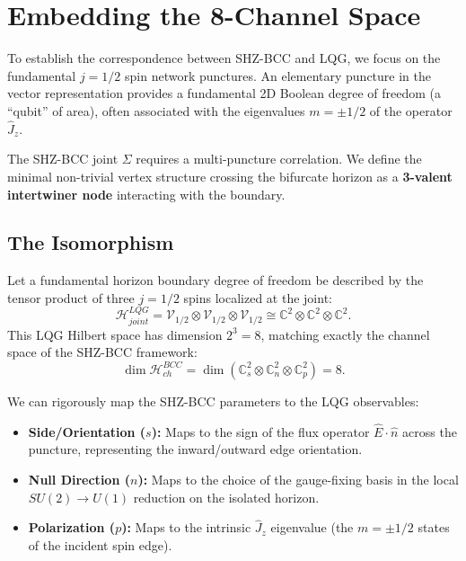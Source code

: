 \documentclass[11pt,a4paper]{article}
\begin{document}
\section{Embedding the 8-Channel Space}
To establish the correspondence between SHZ-BCC and LQG, we focus on the fundamental $j = 1/2$ spin network punctures. An elementary puncture in the vector representation provides a fundamental 2D Boolean degree of freedom (a ``qubit'' of area), often associated with the eigenvalues $m = \pm 1/2$ of the operator $\hat{J}_z$.

The SHZ-BCC joint $\Sigma$ requires a multi-puncture correlation. We define the minimal non-trivial vertex structure crossing the bifurcate horizon as a \textbf{3-valent intertwiner node} interacting with the boundary. 

\subsection{The Isomorphism}
Let a fundamental horizon boundary degree of freedom be described by the tensor product of three $j=1/2$ spins localized at the joint:
\begin{equation}
    \mathcal{H}_{joint}^{LQG} = \mathcal{V}_{1/2} \otimes \mathcal{V}_{1/2} \otimes \mathcal{V}_{1/2} \cong \mathbb{C}^2 \otimes \mathbb{C}^2 \otimes \mathbb{C}^2.
\end{equation}
This LQG Hilbert space has dimension $2^3 = 8$, matching exactly the channel space of the SHZ-BCC framework:
\begin{equation}
    \dim \mathcal{H}_{ch}^{BCC} = \dim \left( \mathbb{C}^2_s \otimes \mathbb{C}^2_n \otimes \mathbb{C}^2_p \right) = 8.
\end{equation}

We can rigorously map the SHZ-BCC parameters to the LQG observables:
\begin{itemize}
    \item \textbf{Side/Orientation ($s$):} Maps to the sign of the flux operator $\hat{E} \cdot \hat{n}$ across the puncture, representing the inward/outward edge orientation.
    \item \textbf{Null Direction ($n$):} Maps to the choice of the gauge-fixing basis in the local $SU(2) \to U(1)$ reduction on the isolated horizon.
    \item \textbf{Polarization ($p$):} Maps to the intrinsic $\hat{J}_z$ eigenvalue (the $m = \pm 1/2$ states of the incident spin edge).
\end{itemize}
\end{document}
